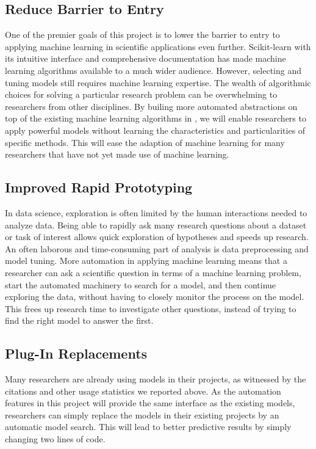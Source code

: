 \subsection{Reduce Barrier to Entry}
One of the premier goals of this project is to lower the barrier to entry
to applying machine learning in scientific applications even further.
Scikit-learn with its intuitive interface and comprehensive documentation
has made machine learning algorithms available to a much wider audience.
However, selecting and tuning models still requires machine learning expertise.
The wealth of algorithmic choices for solving a particular research problem can be
overwhelming to researchers from other disciplines. By builing more automated
abstractions on top of the existing machine learning algorithms in \sklearn{},
we will enable researchers to apply powerful models without learning
the characteristics and particularities of specific methods.
This will ease the adaption of machine learning for many researchers
that have not yet made use of machine learning.

\subsection{Improved Rapid Prototyping}
In data science, exploration is often limited by the human interactions needed to analyze data.
Being able to rapidly ask many research questions about a dataset or task of interest allows
quick exploration of hypotheses and speeds up research.
An often laborous and time-consuming part of analysis is data preprocessing and model tuning.
More automation in applying machine learning means that a researcher can ask a scientific
question in terms of a machine learning problem, start the automated machinery to
search for a model, and then continue exploring the data, without having to closely monitor
the process on the model. 
This frees up research time to investigate other questions, instead of trying to
find the right model to answer the first.

\subsection{Plug-In Replacements}
Many researchers are already using \sklearn{} models in their projects, as witnessed
by the citations and other usage statistics we reported above. As the automation features
in this project will provide the same interface as the existing models, researchers
can simply replace the models in their existing projects by an automatic model search.
This will lead to better predictive results by simply changing two lines of code.

